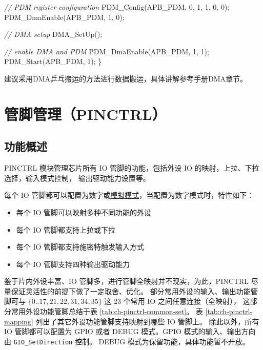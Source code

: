 \documentclass[
  12pt,
]{book}
\newenvironment{Shaded}{\begin{snugshade}}{\end{snugshade}}
\newcommand{\CommentTok}[1]{\textcolor[rgb]{0.56,0.35,0.01}{\textit{#1}}}
\newcommand{\DecValTok}[1]{\textcolor[rgb]{0.00,0.00,0.81}{#1}}
\newcommand{\NormalTok}[1]{#1}
\providecommand{\tightlist}{%
  \setlength{\itemsep}{0pt}\setlength{\parskip}{0pt}}
\begin{document}
\begin{Shaded}
\begin{Highlighting}[]
    \CommentTok{// PDM register configuration}
\NormalTok{    PDM_Config(APB_PDM, }\DecValTok{0}\NormalTok{, }\DecValTok{1}\NormalTok{, }\DecValTok{1}\NormalTok{, }\DecValTok{0}\NormalTok{, }\DecValTok{0}\NormalTok{);    }
\NormalTok{    PDM_DmaEnable(APB_PDM, }\DecValTok{1}\NormalTok{, }\DecValTok{0}\NormalTok{);}
    
    \CommentTok{// DMA setup}
\NormalTok{    DMA_SetUp();}
    
    \CommentTok{// enable DMA and PDM}
\NormalTok{    PDM_DmaEnable(APB_PDM, }\DecValTok{1}\NormalTok{, }\DecValTok{1}\NormalTok{);}
\NormalTok{    PDM_Start(APB_PDM, }\DecValTok{1}\NormalTok{);}
\NormalTok{\}}
\end{Highlighting}
\end{Shaded}

建议采用DMA乒乓搬运的方法进行数据搬运，具体讲解参考手册DMA章节。

\hypertarget{ch-pinctrl}{%
\chapter{管脚管理（PINCTRL）}\label{ch-pinctrl}}

\hypertarget{ux529fux80fdux6982ux8ff0-4}{%
\section{功能概述}\label{ux529fux80fdux6982ux8ff0-4}}

PINCTRL 模块管理芯片所有 IO 管脚的功能，包括外设 IO 的映射，上拉、下拉选择，输入模式控制，
输出驱动能力设置等。

每个 IO 管脚都可以配置为数字或\protect\hyperlink{pinctrl-config-analog}{模拟模式}，当配置为数字模式时，特性如下：

\begin{itemize}
\tightlist
\item
  每个 IO 管脚可以映射多种不同功能的外设
\item
  每个 IO 管脚都支持上拉或下拉
\item
  每个 IO 管脚都支持施密特触发输入方式
\item
  每个 IO 管脚支持四种输出驱动能力
\end{itemize}

鉴于片内外设丰富、IO 管脚多，进行管脚全映射并不现实，为此，PINCTRL 尽量保证灵活性的前提下做了一定取舍、优化。
部分常用外设的输入、输出功能管脚可与 \(\{{0 .. 17, 21, 22, 31, 34, 35\}}\) 这 23 个常用 IO 之间任意连接（全映射），
这部分常用外设功能管脚总结于表 \ref{tab:ch-pinctrl-common-set}。
表 \ref{tab:ch-pinctrl-mapping} 列出了其它外设功能管脚支持映射到哪些 IO 管脚上。
除此以外，所有 IO 管脚都可以配置为 GPIO 或者 DEBUG 模式。GPIO 模式的输入、输出方向由 \texttt{GIO\_SetDirection} 控制。
DEBUG 模式为保留功能，具体功能暂不开放。
\end{document}
